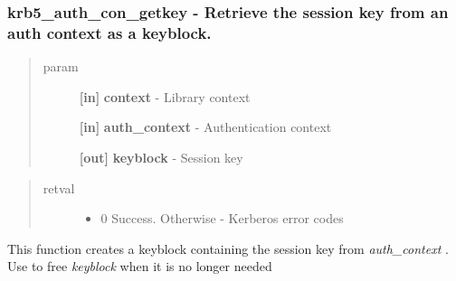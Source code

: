 \documentclass[letterpaper,10pt,english]{sphinxmanual}
\begin{document}
\subsubsection{krb5\_auth\_con\_getkey -  Retrieve the session key from an auth context as a keyblock.}
\label{appdev/refs/api/krb5_auth_con_getkey::doc}\label{appdev/refs/api/krb5_auth_con_getkey:krb5-auth-con-getkey-retrieve-the-session-key-from-an-auth-context-as-a-keyblock}

\begin{fulllineitems}
\label{appdev/refs/api/krb5_auth_con_getkey:krb5_auth_con_getkey}
\end{fulllineitems}

\begin{quote}\begin{description}
\item[{param}] \leavevmode
\textbf{{[}in{]}} \textbf{context} - Library context

\textbf{{[}in{]}} \textbf{auth\_context} - Authentication context

\textbf{{[}out{]}} \textbf{keyblock} - Session key

\end{description}\end{quote}
\begin{quote}\begin{description}
\item[{retval}] \leavevmode\begin{itemize}
\item {} 
0   Success. Otherwise - Kerberos error codes

\end{itemize}

\end{description}\end{quote}

This function creates a keyblock containing the session key from \emph{auth\_context} . Use {\hyperref[appdev/refs/api/krb5_free_keyblock:krb5_free_keyblock]{}} to free \emph{keyblock} when it is no longer needed
\end{document}
